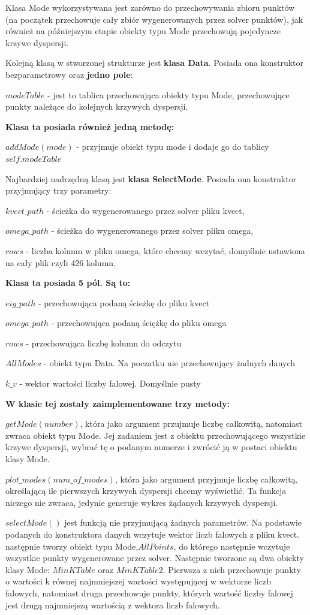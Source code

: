 Klasa Mode wykorzystywana jest zarówno do przechowywania zbioru punktów (na początek przechowuje cały zbiór wygenerowanych przez solver punktów), jak również na późniejszym etapie obiekty typu Mode przechowują pojedyncze krzywe dyspersji.

Kolejną klasą w stworzonej strukturze jest \textbf{klasa Data}. Posiada ona konstruktor bezparametrowy oraz \textbf{jedno pole}:

$modeTable$ - jest to tablica przechowująca obiekty typu Mode, przechowujące punkty należące do kolejnych krzywych dyspersji.

\textbf{Klasa ta posiada również jedną metodę:}

$addMode(mode)$ - przyjmuje obiekt typu mode i dodaje go do tablicy $self.modeTable$

Najbardziej nadrzędną klasą jest \textbf{klasa SelectMode}. Posiada ona konstruktor przyjmujący trzy parametry: 

$kvect\_path$ - ścieżka do wygenerowanego przez solver pliku kvect, 

$omega\_path$ - ścieżka do wygenerowanego przez solver pliku omega, 

$rows$ - liczba kolumn w pliku omega, które chcemy wczytać, domyślnie ustawiona na cały plik czyli 426 kolumn.

\textbf{Klasa ta posiada 5 pól. Są to:}

$eig\_path$ - przechowująca podaną ścieżkę do pliku kvect

$omega\_path$ - przechowująca podaną ściężkę do pliku omega

$rows$ - przechowująca liczbę kolumn do odczytu

$AllModes$ - obiekt typu Data. Na poczatku nie przechowujący żadnych danych

$k\_v$ - wektor wartości liczby falowej. Domyślnie pusty

\textbf{W klasie tej zostały zaimplementowane trzy metody:}

$getMode(number)$, która jako argument przujmuje liczbę całkowitą, natomiast zwraca obiekt typu Mode. Jej zadaniem jest z obiektu przechowującego wszystkie krzywe dyspersji, wybrać tę o podanym numerze i zwrócić ją w postaci obiektu klasy Mode.

$plot\_modes(num\_of\_modes)$, która jako argument przyjmuje liczbę całkowitą, określającą ile pierwszych krzywych dyspersji chcemy wyświetlić. Ta funkcja niczego nie zwraca, jedynie generuje wykres żądanych krzywych dyspersji.

$selectMode()$ jest funkcją nie przyjmującą żadnych parametrów. Na podstawie podanych do konstruktora danych wczytuje wektor liczb falowych z pliku kvect. następnie tworzy obiekt typu Mode,$AllPoints$, do którego następnie wczytuje wszystkie punkty wygenerowane przez solver. Następnie tworzone są dwa obiekty klasy Mode: $MinKTable$ oraz $MinKTable2$. Pierwsza z nich przechowuje punkty o wartości k równej najmniejszej wartości występującej w wektorze liczb falowych, natomiast druga przechowuje punkty, których wartość liczby falowej jest drugą najmniejszą wartością z wektora liczb falowych.

